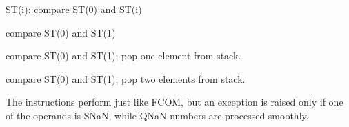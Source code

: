   \item[FUCOM] ST(i): compare ST(0) and ST(i)
  \item[FUCOM] compare ST(0) and ST(1)
  \item[FUCOMP] compare ST(0) and ST(1); pop one element from stack.
  \item[FUCOMPP] compare ST(0) and ST(1); pop two elements from stack.
 
The instructions perform just like FCOM, but an exception is raised only if one of the operands is SNaN,
  while QNaN numbers are processed smoothly.
